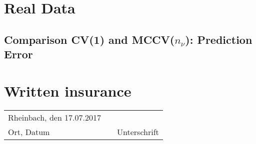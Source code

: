 \documentclass[12pt,a4paper]{article}
\begin{document}

	
	
\renewcommand{\contentsname}{Table of Contents}
\newpage 								
\tableofcontents	
					      



\newpage

		




	





\section{Real Data}

\subsection{Comparison CV(1) and MCCV($n_{\nu}$): Prediction Error}




	
\newpage
{} 		      %
\setcounter{page}{1}			  %





\newpage 								 
\medskip
\renewcommand{\bibname}{References}

   



\newpage
\section*{Written insurance}


\begin{tabular}{lp{2em}l}
	Rheinbach, den 17.07.2017   && 
	\\\cline{1-1}\cline{3-3}
	Ort, Datum     && Unterschrift
\end{tabular}
\end{document}
